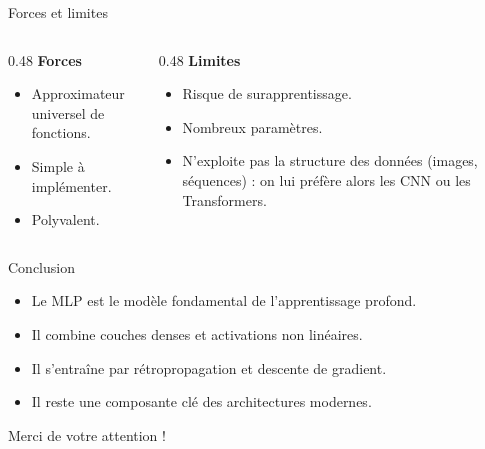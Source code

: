 \documentclass{beamer}
\begin{document}
\begin{frame}{Forces et limites}
  \begin{columns}[T]
    \begin{column}{0.48\textwidth}
      \textbf{Forces}
      \begin{itemize}
        \item Approximateur universel de fonctions.
        \item Simple à implémenter.
        \item Polyvalent.
      \end{itemize}
    \end{column}
    \begin{column}{0.48\textwidth}
      \textbf{Limites}
      \begin{itemize}
        \item Risque de surapprentissage.
        \item Nombreux paramètres.
        \item N'exploite pas la structure des données (images, séquences) : on lui préfère alors les CNN ou les Transformers.
      \end{itemize}
    \end{column}
  \end{columns}
\end{frame}

\begin{frame}{Conclusion}
  \begin{itemize}
    \item Le MLP est le modèle fondamental de l'apprentissage profond.
    \item Il combine couches denses et activations non linéaires.
    \item Il s'entraîne par rétropropagation et descente de gradient.
    \item Il reste une composante clé des architectures modernes.
  \end{itemize}
  \vfill
  \centering
  \Large Merci de votre attention !
\end{frame}
\end{document}
